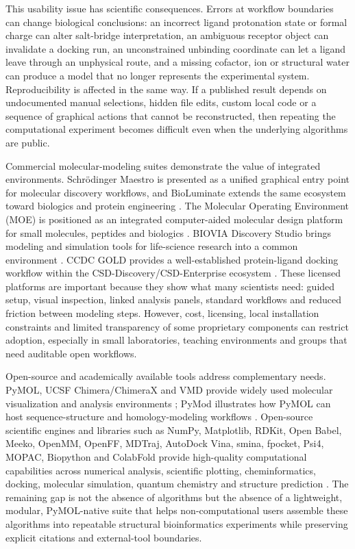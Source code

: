 \documentclass[pdflatex,sn-vancouver-num]{sn-jnl}
\begin{document}
This usability issue has scientific consequences.  Errors at workflow boundaries can change biological conclusions: an incorrect ligand protonation state or formal charge can alter salt-bridge interpretation, an ambiguous receptor object can invalidate a docking run, an unconstrained unbinding coordinate can let a ligand leave through an unphysical route, and a missing cofactor, ion or structural water can produce a model that no longer represents the experimental system.  Reproducibility is affected in the same way.  If a published result depends on undocumented manual selections, hidden file edits, custom local code or a sequence of graphical actions that cannot be reconstructed, then repeating the computational experiment becomes difficult even when the underlying algorithms are public.

Commercial molecular-modeling suites demonstrate the value of integrated environments.  Schrödinger Maestro is presented as a unified graphical entry point for molecular discovery workflows, and BioLuminate extends the same ecosystem toward biologics and protein engineering \cite{schrodinger_maestro,schrodinger_bioluminate}.  The Molecular Operating Environment (MOE) is positioned as an integrated computer-aided molecular design platform for small molecules, peptides and biologics \cite{moe}.  BIOVIA Discovery Studio brings modeling and simulation tools for life-science research into a common environment \cite{discovery_studio}.  CCDC GOLD provides a well-established protein-ligand docking workflow within the CSD-Discovery/CSD-Enterprise ecosystem \cite{ccdc_gold}.  These licensed platforms are important because they show what many scientists need: guided setup, visual inspection, linked analysis panels, standard workflows and reduced friction between modeling steps.  However, cost, licensing, local installation constraints and limited transparency of some proprietary components can restrict adoption, especially in small laboratories, teaching environments and groups that need auditable open workflows.

Open-source and academically available tools address complementary needs.  PyMOL, UCSF Chimera/ChimeraX and VMD provide widely used molecular visualization and analysis environments \cite{pymol,chimera2004,chimerax2021,vmd1996}; PyMod illustrates how PyMOL can host sequence-structure and homology-modeling workflows \cite{pymod2017}.  Open-source scientific engines and libraries such as NumPy, Matplotlib, RDKit, Open Babel, Meeko, OpenMM, OpenFF, MDTraj, AutoDock Vina, smina, fpocket, Psi4, MOPAC, Biopython and ColabFold provide high-quality computational capabilities across numerical analysis, scientific plotting, cheminformatics, docking, molecular simulation, quantum chemistry and structure prediction \cite{numpy2020,matplotlib2007,rdkit,openbabel2011,meeko,openmm2017,openff2018,mdtraj2015,vina2010,smina2013,fpocket2009,psi42020,mopac1990,biopython2009,colabfold2022}.  The remaining gap is not the absence of algorithms but the absence of a lightweight, modular, PyMOL-native suite that helps non-computational users assemble these algorithms into repeatable structural bioinformatics experiments while preserving explicit citations and external-tool boundaries.
\end{document}
